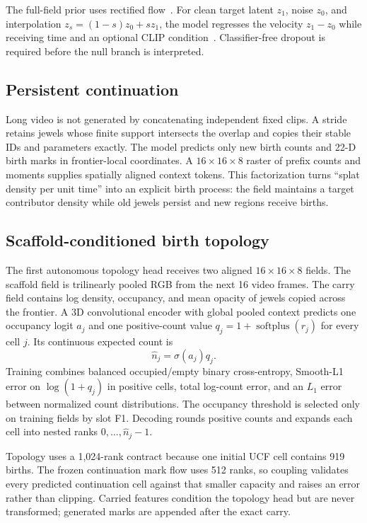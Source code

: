 \documentclass[10pt]{article}
\begin{document}
The full-field prior uses rectified flow~\cite{lipman2023flow}. For clean target latent $z_1$, noise
$z_0$, and interpolation $z_s=(1-s)z_0+sz_1$, the model regresses the velocity $z_1-z_0$ while
receiving time and an optional CLIP condition~\cite{radford2021clip}. Classifier-free dropout is
required before the null branch is interpreted.

\subsection{Persistent continuation}

Long video is not generated by concatenating independent fixed clips. A stride retains jewels whose
finite support intersects the overlap and copies their stable IDs and parameters exactly. The model
predicts only new birth counts and 22-D birth marks in frontier-local coordinates. A
$16\times16\times8$ raster of prefix counts and moments supplies spatially aligned context tokens.
This factorization turns ``splat density per unit time'' into an explicit birth process: the field
maintains a target contributor density while old jewels persist and new regions receive births.

\subsection{Scaffold-conditioned birth topology}

The first autonomous topology head receives two aligned
$16\times16\times8$ fields. The scaffold field is trilinearly pooled RGB from the next 16 video
frames. The carry field contains log density, occupancy, and mean opacity of jewels copied across
the frontier. A 3D convolutional encoder with global pooled context predicts one occupancy logit
$a_j$ and one positive-count value $q_j=1+\operatorname{softplus}(r_j)$ for every cell $j$. Its
continuous expected count is
\begin{equation}
\hat n_j=\sigma(a_j)q_j.
\end{equation}
Training combines balanced occupied/empty binary cross-entropy, Smooth-L1 error on
$\log(1+q_j)$ in positive cells, total log-count error, and an $L_1$ error between normalized count
distributions. The occupancy threshold is selected only on training fields by slot F1. Decoding
rounds positive counts and expands each cell into nested ranks $0,\ldots,\hat n_j-1$.

Topology uses a 1,024-rank contract because one initial UCF cell contains 919 births. The frozen
continuation mark flow uses 512 ranks, so coupling validates every predicted continuation cell
against that smaller capacity and raises an error rather than clipping. Carried features condition
the topology head but are never transformed; generated marks are appended after the exact carry.
\end{document}
